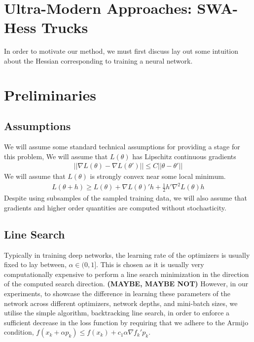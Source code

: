 \documentclass{article}
\begin{document}
\section{Ultra-Modern Approaches: SWA-Hess Trucks}

In order to motivate our method, we must first discuss lay out some intuition about the Hessian corresponding to training a neural network.



\section{Preliminaries}

\subsection{Assumptions}
We will assume some standard technical assumptions for providing a stage for this problem,
We will assume that $L(\theta)$ has Lipschitz continuous gradients
\begin{gather*}
||\nabla L(\theta) - \nabla L(\theta')|| \leq C||\theta - \theta'||
\end{gather*}
We will assume that $L(\theta)$ is strongly convex near some local minimum.
\begin{gather*}
L(\theta + h) \geq L(\theta) + \nabla L(\theta)'h + \frac{1}{2}h'\nabla^2L(\theta)h
\end{gather*}
Despite using subsamples of the sampled training data, we will also assume that gradients and higher order quantities are computed without stochasticity.

\subsection{Line Search}
Typically in training deep networks, the learning rate of the optimizers is usually fixed to lay between, $\alpha \in (0,1]$. This is chosen as it is usually very computationally expensive to perform a line search minimization in the direction of the computed search direction.\textbf{ (MAYBE, MAYBE NOT)} However, in our experiments, to showcase the difference in learning these parameters of the network across different optimizers, network depths, and mini-batch sizes, we utilise the simple algorithm, backtracking line search, in order to enforce a sufficient decrease in the loss function by requiring that we adhere to the Armijo condition,
$
f(x_k + \alpha p_k) \leq f(x_k) + c_1 \alpha \nabla f_k' p_k
$.
\end{document}
